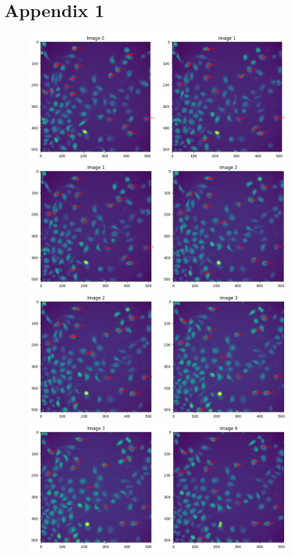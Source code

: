\documentclass{article}
\begin{document}
\section*{Appendix 1}


\begin{figure}[h!]
\centering
\includegraphics[width=0.75\linewidth]{Report/RImages/Traces_Control/image_1a.png}
\includegraphics[width=0.75\linewidth]{Report/RImages/Traces_Control/image_2a.png}
\includegraphics[width=0.75\linewidth]{Report/RImages/Traces_Control/image_3a.png}
\includegraphics[width=0.75\linewidth]{Report/RImages/Traces_Control/image_4a.png}
\end{figure}
\end{document}
